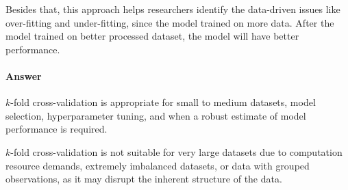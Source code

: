 Besides that, this approach helps researchers identify the 
data-driven issues like over-fitting and under-fitting, 
since the model trained on more data.
After the model trained on better processed dataset, the model will 
have better performance.

\paragraph{Answer}
$k$-fold cross-validation 
is appropriate for small to medium datasets, model selection, 
hyperparameter tuning, and when a robust estimate of model performance is required. 

$k$-fold cross-validation is not suitable for very large datasets due to 
computation resource demands, extremely imbalanced datasets, 
or data with grouped observations, 
as it may disrupt the inherent structure of the data.
